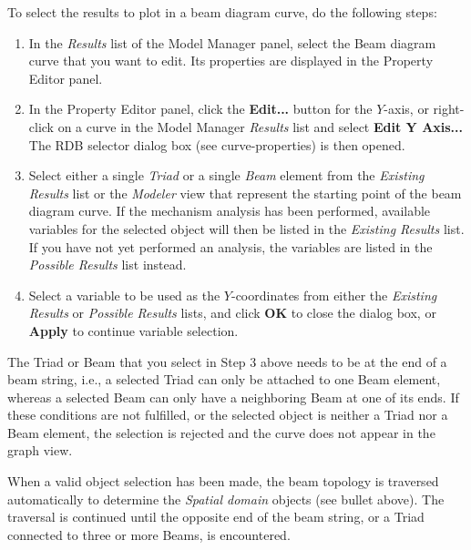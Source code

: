 
To select the results to plot in a beam diagram curve, do the following steps:

\begin{enumerate}
\item
  In the {\sl Results} list of the Model Manager panel, select the Beam diagram
  curve that you want to edit. Its properties are displayed in the Property
  Editor panel.
\item
  In the Property Editor panel, click the \textbf{Edit...} button for the
  $Y$-axis, or right-click on a curve in the Model Manager {\sl Results} list
  and select \textbf{Edit Y Axis...} The RDB selector dialog box (see
                {curve-properties}) is then opened.
\item
  Select either a single {\sl Triad} or a single {\sl Beam} element
  from the {\sl Existing Results} list or the {\sl Modeler} view
  that represent the starting point of the beam diagram curve.
  If the mechanism analysis has been performed, available variables for
  the selected object will then be listed in the {\sl Existing Results} list.
  If you have not yet performed an analysis, the variables are listed in the
  {\sl Possible Results} list instead.
\item
  Select a variable to be used as the $Y$-coordinates from either the
  {\sl Existing Results} or {\sl Possible Results} lists, and click \textbf{OK}
  to close the dialog box, or \textbf{Apply} to continue variable selection.
\end{enumerate}

The Triad or Beam that you select in Step 3 above needs to be at the end of a
beam string, i.e., a selected Triad can only be attached to one Beam element,
whereas a selected Beam can only have a neighboring Beam at one of its ends.
If these conditions are not fulfilled, or the selected object is neither a Triad
nor a Beam element, the selection is rejected and the curve does not appear
in the graph view.

When a valid object selection has been made, the beam topology is traversed
automatically to determine the {\sl Spatial domain} objects (see bullet
 above). The traversal is continued until the opposite end of the
beam string, or a Triad connected to three or more Beams, is encountered.


